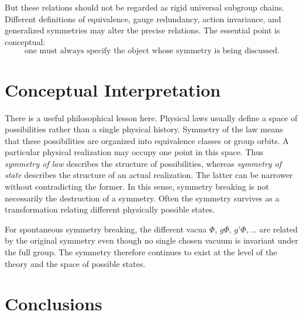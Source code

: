 But these relations should not be regarded as rigid universal subgroup chains.
Different definitions of equivalence, gauge redundancy, action invariance, and
generalized symmetries may alter the precise relations.
The essential point is conceptual:
\[
\boxed{
\text{one must always specify the object whose symmetry is being discussed}.
}
\]

\section{Conceptual Interpretation}
\label{sp:ci}

There is a useful philosophical lesson here.
Physical laws usually define a space of possibilities rather than a single
physical history. Symmetry of the law means that these possibilities are
organized into equivalence classes or group orbits. A particular physical
realization may occupy one point in this space.
Thus \emph{symmetry of law} describes the structure of possibilities,
whereas \emph{symmetry of state} 
describes the structure of an actual realization.
The latter can be narrower without contradicting the former.
In this sense, symmetry breaking is not necessarily the destruction of a
symmetry.  Often the symmetry survives as a transformation relating different
physically possible states.

For spontaneous symmetry breaking, the different vacua
$\Phi$, $g\Phi$, $g'\Phi,\ldots$
are related by the original symmetry even though no single chosen vacuum is
invariant under the full group. The symmetry therefore continues to exist at
the level of the theory and the space of possible states.

\section{ Conclusions}
\label{sp:co}

